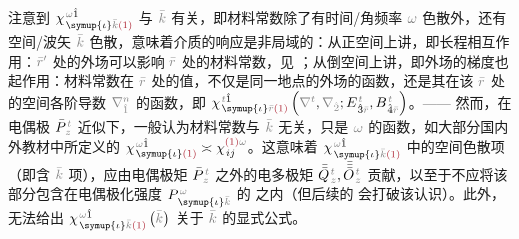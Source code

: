 注意到 $\chi^{\;\! \mathcolor{gray}{\omega} \hat{1}}_{\;\! \symup{\iota} \mathcolor{gray}{\bar{k}} \textcolor{Maroon}{(1)}}$ 与 $\mathcolor{gray}{\bar{k}}$ 有关，即材料常数除了有时间/角频率 $\mathcolor{gray}{\omega}$ 色散外，还有空间/波矢 $\mathcolor{gray}{\bar{k}}$ 色散，意味着介质的响应是非局域的：从正空间上讲，即长程相互作用：$\mathcolor{gray}{\bar{r}'}$ 处的外场可以影响 $\mathcolor{gray}{\bar{r}}$ 处的材料常数，见 ；从倒空间上讲，即外场的梯度也起作用：材料常数在 $\mathcolor{gray}{\bar{r}}$ 处的值，不仅是同一地点的外场的函数，还是其在该 $\mathcolor{gray}{\bar{r}}$ 处的空间各阶导数 $\mathcolor{gray}{\nabla^n_{\hat{1}}}$ 的函数，即 $\chi^{\;\! \mathcolor{gray}{t} \hat{1}}_{\;\! \symup{\iota} \mathcolor{gray}{\bar{r}} \textcolor{Maroon}{(1)}} \left( \mathcolor{gray}{\nabla^t}, \mathcolor{gray}{\nabla_{\hat{2}}} ; E^{\;\!\mathcolor{gray}{t}}_{\;\! \hat{3}\mathcolor{gray}{\bar{r}}}, B^{\;\!\mathcolor{gray}{t}}_{\;\! \hat{4}\mathcolor{gray}{\bar{r}}} \right)$。—— 然而，在电偶极 $\bar{P}^{\;\!\mathcolor{gray}{t}}_{\;\!\mathcolor{gray}{z}}$ 近似下，一般认为材料常数与 $\mathcolor{gray}{\bar{k}}$ 无关，只是 $\mathcolor{gray}{\omega}$ 的函数，如大部分国内外教材中所定义的 $\chi^{\;\! \mathcolor{gray}{\omega} \hat{1}}_{\;\! \symup{\iota} \textcolor{Maroon}{(1)}} \asymp \chi^{ \textcolor{Maroon}{(1)} \mathcolor{gray}{\omega}}_{\;\! ij}$。这意味着 $\chi^{\;\! \mathcolor{gray}{\omega} \hat{1}}_{\;\! \symup{\iota} \mathcolor{gray}{\bar{k}} \textcolor{Maroon}{(1)}}$ 中的空间色散项（即含 $\mathcolor{gray}{\bar{k}}$ 项），应由电偶极矩 $\bar{P}^{\;\!\mathcolor{gray}{t}}_{\;\!\mathcolor{gray}{z}}$ 之外的电多极矩 $\bar{\bar{Q}}^{\;\!\mathcolor{gray}{t}}_{\;\!\mathcolor{gray}{z}},\bar{\bar{\bar{O}}}^{\;\!\mathcolor{gray}{t}}_{\;\!\mathcolor{gray}{z}}$ 贡献\cite{shenNonlinearOpticalSusceptibilities2001}，以至于不应将该部分包含在电偶极化强度 $P^{\;\!\mathcolor{gray}{\omega}}_{\;\! \symup{\iota}\mathcolor{gray}{\bar{k}}}$ 的  之内（但后续的  会打破该认识）。此外， 无法给出 $\chi^{\;\! \mathcolor{gray}{\omega} \hat{1}}_{\;\! \symup{\iota} \mathcolor{gray}{\bar{k}} \textcolor{Maroon}{(1)}} \left( \mathcolor{gray}{\bar{k}} \right)$ 关于 $\mathcolor{gray}{\bar{k}}$ 的显式公式。

